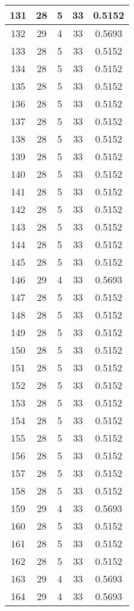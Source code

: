 \documentclass[letterpaper, 12pt]{article}
\begin{document}
\begin{longtable}{|c|c|c|c|c|}
\hline
131 & 28 & 5 & 33 & 0.5152 \\
\hline
132 & 29 & 4 & 33 & 0.5693 \\
\hline
133 & 28 & 5 & 33 & 0.5152 \\
\hline
134 & 28 & 5 & 33 & 0.5152 \\
\hline
135 & 28 & 5 & 33 & 0.5152 \\
\hline
136 & 28 & 5 & 33 & 0.5152 \\
\hline
137 & 28 & 5 & 33 & 0.5152 \\
\hline
138 & 28 & 5 & 33 & 0.5152 \\
\hline
139 & 28 & 5 & 33 & 0.5152 \\
\hline
140 & 28 & 5 & 33 & 0.5152 \\
\hline
141 & 28 & 5 & 33 & 0.5152 \\
\hline
142 & 28 & 5 & 33 & 0.5152 \\
\hline
143 & 28 & 5 & 33 & 0.5152 \\
\hline
144 & 28 & 5 & 33 & 0.5152 \\
\hline
145 & 28 & 5 & 33 & 0.5152 \\
\hline
146 & 29 & 4 & 33 & 0.5693 \\
\hline
147 & 28 & 5 & 33 & 0.5152 \\
\hline
148 & 28 & 5 & 33 & 0.5152 \\
\hline
149 & 28 & 5 & 33 & 0.5152 \\
\hline
150 & 28 & 5 & 33 & 0.5152 \\
\hline
151 & 28 & 5 & 33 & 0.5152 \\
\hline
152 & 28 & 5 & 33 & 0.5152 \\
\hline
153 & 28 & 5 & 33 & 0.5152 \\
\hline
154 & 28 & 5 & 33 & 0.5152 \\
\hline
155 & 28 & 5 & 33 & 0.5152 \\
\hline
156 & 28 & 5 & 33 & 0.5152 \\
\hline
157 & 28 & 5 & 33 & 0.5152 \\
\hline
158 & 28 & 5 & 33 & 0.5152 \\
\hline
159 & 29 & 4 & 33 & 0.5693 \\
\hline
160 & 28 & 5 & 33 & 0.5152 \\
\hline
161 & 28 & 5 & 33 & 0.5152 \\
\hline
162 & 28 & 5 & 33 & 0.5152 \\
\hline
163 & 29 & 4 & 33 & 0.5693 \\
\hline
164 & 29 & 4 & 33 & 0.5693 \\

\end{longtable}
\end{document}
